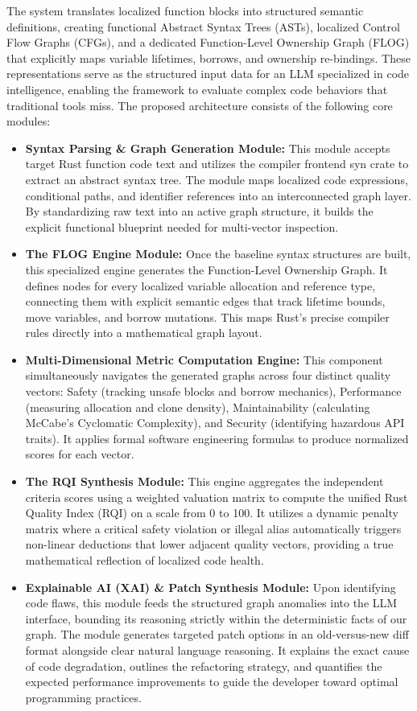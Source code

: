 The system translates localized function blocks into structured semantic definitions, creating functional Abstract Syntax Trees (ASTs), localized Control Flow Graphs (CFGs), and a dedicated Function-Level Ownership Graph (FLOG) that explicitly maps variable lifetimes, borrows, and ownership re-bindings. These representations serve as the structured input data for an LLM specialized in code intelligence, enabling the framework to evaluate complex code behaviors that traditional tools miss. The proposed architecture consists of the following core modules:
\begin{itemize}
    \item \textbf{Syntax Parsing \& Graph Generation Module:} This module accepts target Rust function code text and utilizes the compiler frontend syn crate to extract an abstract syntax tree. The module maps localized code expressions, conditional paths, and identifier references into an interconnected graph layer. By standardizing raw text into an active graph structure, it builds the explicit functional blueprint needed for multi-vector inspection.
    \item \textbf{The FLOG Engine Module:} Once the baseline syntax structures are built, this specialized engine generates the Function-Level Ownership Graph. It defines nodes for every localized variable allocation and reference type, connecting them with explicit semantic edges that track lifetime bounds, move variables, and borrow mutations. This maps Rust's precise compiler rules directly into a mathematical graph layout.
    \item \textbf{Multi-Dimensional Metric Computation Engine:} This component simultaneously navigates the generated graphs across four distinct quality vectors: Safety (tracking unsafe blocks and borrow mechanics), Performance (measuring allocation and clone density), Maintainability (calculating McCabe's Cyclomatic Complexity), and Security (identifying hazardous API traits). It applies formal software engineering formulas to produce normalized scores for each vector.
    \item \textbf{The RQI Synthesis Module:} This engine aggregates the independent criteria scores using a weighted valuation matrix to compute the unified Rust Quality Index (RQI) on a scale from 0 to 100. It utilizes a dynamic penalty matrix where a critical safety violation or illegal alias automatically triggers non-linear deductions that lower adjacent quality vectors, providing a true mathematical reflection of localized code health.
    \item \textbf{Explainable AI (XAI) \& Patch Synthesis Module:} Upon identifying code flaws, this module feeds the structured graph anomalies into the LLM interface, bounding its reasoning strictly within the deterministic facts of our graph. The module generates targeted patch options in an old-versus-new diff format alongside clear natural language reasoning. It explains the exact cause of code degradation, outlines the refactoring strategy, and quantifies the expected performance improvements to guide the developer toward optimal programming practices.
\end{itemize}

